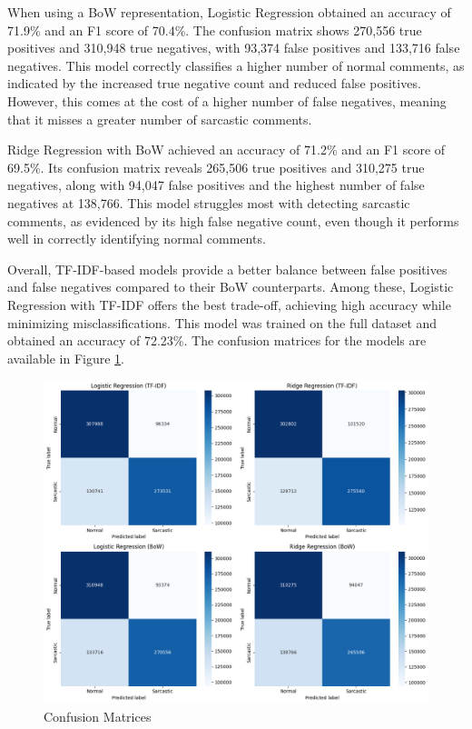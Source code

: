 When using a BoW representation, Logistic Regression obtained an accuracy of 71.9\% and an F1 score of 70.4\%. The confusion matrix shows 270,556 true positives and 310,948 true negatives, 
with 93,374 false positives and 133,716 false negatives. This model correctly classifies a higher number of normal comments, as indicated by the increased true negative count and reduced 
false positives. However, this comes at the cost of a higher number of false negatives, meaning that it misses a greater number of sarcastic comments.

Ridge Regression with BoW achieved an accuracy of 71.2\% and an F1 score of 69.5\%. Its confusion matrix reveals 265,506 true positives and 310,275 true negatives, along with 
94,047 false positives and the highest number of false negatives at 138,766. This model struggles most with detecting sarcastic comments, as evidenced by its high false negative count, 
even though it performs well in correctly identifying normal comments.

Overall, TF-IDF-based models provide a better balance between false positives and false negatives compared to their BoW counterparts. Among these, Logistic Regression with TF-IDF offers 
the best trade-off, achieving high accuracy while minimizing misclassifications. This model was trained on the full dataset and obtained an accuracy of 72.23\%. The confusion matrices 
for the models are available in Figure \ref{Fig_4}.

\begin{figure}
    \centering
    \includegraphics[width=0.8\linewidth]{img/conf_matrix.png}
    \caption{Confusion Matrices}
    \label{Fig_4}
\end{figure}
